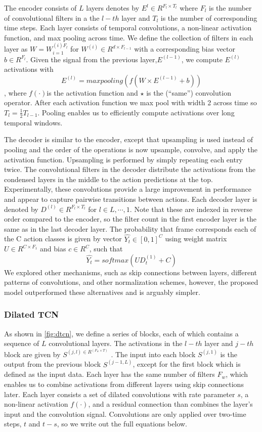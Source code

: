 The encoder consists of $L$ layers denotes by $E^l \in R^{F_l\times T_l}$ where $F_l$ is the number of convolutional filters in a the $l-th$ layer and $T_l$ is the number of corresponding time steps. Each layer consists of temporal convolutions, a non-linear activation function, and max pooling across time. We define the collection of filters in each layer as $W=W^{(i)F_l}_{i=1}$ for $W^{(i)} \in R ^{d \times F_{l-1}}$ with a corresponding bias vector $b \in R^{F_l}$. Given the signal from the previous layer,$E^{(l-1)}$, we compute $E^{(l)}$activations  with $$E^{(l)} = max pooling(f(W \times E^{(l-1)} + b ))$$, where $f(\cdot)$is the activation function and $\star$ is the (“same”) convolution operator. After each activation function we max pool with width 2 across time so $T_l = \frac{1}{2}T_{l-1}$. Pooling enables us to efficiently compute activations over long temporal windows.

The decoder is similar to the encoder, except that upsampling is used instead of pooling and the order of the operations is now upsample, convolve, and apply the activation function. Upsampling is performed by simply repeating each entry twice. The convolutional filters in the decoder distribute the activations from the condensed layers in the middle to the action predictions at the top. Experimentally, these convolutions provide a large improvement in performance and appear to capture pairwise transitions between actions. Each decoder layer is denoted by $D^{(l)} \in R^{F_l \times T_l}$ for $l \in L,\cdots,1$. Note that these are indexed in reverse order compared to the encoder, so the filter count in the first encoder layer is the same as in the last decoder layer. The probability that frame  corresponds each of the C action classes is given by vector $\hat{Y_t} \in \left[0,1\right]^C$ using weight matrix $U \in R^{C \times F_1}$ and bias $c \in R^C$, such that $$\hat{Y_t} = softmax(UD_t^{(1)}+C)$$
We explored other mechanisms, such as skip connections between layers, different patterns of convolutions, and other normalization schemes, however, the proposed model outperformed these alternatives and is arguably simpler.

\subsubsection{Dilated TCN}
As shown in \ref{fig:dtcn}, we define a series of blocks, each of which contains a sequence of $L$ convolutional layers. The activations in the $l-th$ layer and $j-th$ block are given by $S^{(j,l) \in R^{(F_w \times T)}}$ . The input into each block $S^{(j,1)}$ is the output from the previous block $S^{(j-1,L)}$, except for the first block which is defined as the input data. Each layer has the same number of filters $F_w$, which enables us to combine activations from different layers using skip connections later. Each layer consists a set of dilated convolutions with rate parameter $s$, a non-linear activation $f(\cdot)$, and a residual connection than combines the layer’s input and the convolution signal. Convolutions are only applied over two-time steps, $t$ and $t-s$, so we write out the full equations below. 

